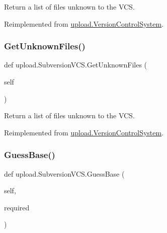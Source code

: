 \begin{DoxyVerb}Return a list of files unknown to the VCS.\end{DoxyVerb}
 

Reimplemented from \mbox{\hyperlink{classupload_1_1VersionControlSystem_a56a60e56aa9aff3df4001d2f84cab884}{upload.\+Version\+Control\+System}}.

\mbox{\label{classupload_1_1SubversionVCS_a494ba1010992d83cac015bc396ab693a}} 
\subsubsection{\texorpdfstring{GetUnknownFiles()}{GetUnknownFiles()}\hspace{0.1cm}{\footnotesize\ttfamily [2/2]}}
{\footnotesize\ttfamily def upload.\+Subversion\+V\+C\+S.\+Get\+Unknown\+Files (\begin{DoxyParamCaption}\item[{}]{self }\end{DoxyParamCaption})}

\begin{DoxyVerb}Return a list of files unknown to the VCS.\end{DoxyVerb}
 

Reimplemented from \mbox{\hyperlink{classupload_1_1VersionControlSystem_a56a60e56aa9aff3df4001d2f84cab884}{upload.\+Version\+Control\+System}}.

\mbox{\label{classupload_1_1SubversionVCS_a7d22d459469a757270502ce0dccacbd2}} 
\subsubsection{\texorpdfstring{GuessBase()}{GuessBase()}\hspace{0.1cm}{\footnotesize\ttfamily [1/2]}}
{\footnotesize\ttfamily def upload.\+Subversion\+V\+C\+S.\+Guess\+Base (\begin{DoxyParamCaption}\item[{}]{self,  }\item[{}]{required }\end{DoxyParamCaption})}

